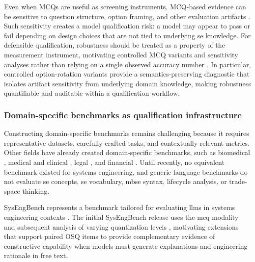Even when MCQs are useful as screening instruments, MCQ-based evidence can be sensitive to question structure, option framing, and other evaluation artifacts \cite{fu_mcq_reasoning_more_confident_when_wrong_2025, zhangMitigatingEasyOption2025}. Such sensitivity creates a model qualification risk: a model may appear to pass or fail depending on design choices that are not tied to underlying \ac{se} knowledge. For defensible qualification, robustness should be treated as a property of the measurement instrument, motivating controlled MCQ variants and sensitivity analyses rather than relying on a single observed accuracy number \cite{Yue_Liu_2023_Reliability_LLMs_Program_Generation}. In particular, controlled option-rotation variants provide a semantics-preserving diagnostic that isolates artifact sensitivity from underlying domain knowledge, making robustness quantifiable and auditable within a qualification workflow.

\subsubsection{Domain-specific benchmarks as qualification infrastructure}\label{subsubsec:motivation_domain_benchmarks}

Constructing domain-specific benchmarks remains challenging because it requires representative datasets, carefully crafted tasks, and contextually relevant metrics. Other fields have already created domain-specific benchmarks, such as biomedical \cite{jin_PubMedQADatasetBiomedicalResearch_2019}, medical and clinical \cite{pal_MedMCQALargescaleMultiSubjectMultiChoice_2022}, legal \cite{guha_LegalBenchCollaborativelyBuilt_2023, chalkidis_LexGLUEBenchmarkDataset_2022}, and financial \cite{xue_FAMMABenchmarkFinancialDomain_2024, islam_FinanceBenchNewBenchmarkFinancial_2023}. Until recently, no equivalent benchmark existed for systems engineering, and generic language benchmarks do not evaluate \ac{se} concepts, \ac{se} vocabulary, \ac{mbse} syntax, lifecycle analysis, or trade-space thinking.

SysEngBench represents a benchmark tailored for evaluating \acp{llm} in systems engineering contexts \cite{bell_IntroducingSysEngBenchNovel_2024,bell_RabellSysEngBenchDatasets_2024}. The initial SysEngBench release uses the \ac{mcq} modality \cite{Bell2025SysEngBench} and subsequent analysis of varying quantization levels \cite{bell_BalancingAccuracyEfficiencyQuantization_2025}, motivating extensions that support paired OSQ items to provide complementary evidence of constructive capability when models must generate explanations and engineering rationale in free text.


